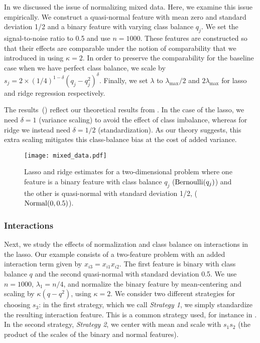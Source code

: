 In  we discussed the issue of normalizing mixed data. Here, we examine
this issue empirically. We construct a quasi-normal feature with mean zero and standard
deviation 1/2 and a binary feature with varying class balance \(q_j\). We set the
signal-to-noise ratio to 0.5 and use \(n = \num{1000}\). These features are constructed so
that their effects are comparable under the notion of comparability that we introduced in
 using \(\kappa = 2\). In order to preserve the comparability for the
baseline case when we have perfect class balance, we scale by \(s_j = 2 \times
(1/4)^{1-\delta}(q_j-q_j^2)^\delta\). Finally, we set \(\lambda\) to
\(\lambda_\text{max}/2\) and \(2\lambda_\text{max}\) for lasso and ridge regression
respectively.

The results~() reflect our theoretical results from
. In the case of the lasso, we need \(\delta =1\) (variance scaling) to
avoid the effect of class imbalance, whereas for ridge we instead need \(\delta =1/2\)
(standardization). As our theory suggests, this extra scaling mitigates this class-balance
bias at the cost of added variance.

\begin{figure}[htpb]
  \centering
  \texttt{[image: mixed\_data.pdf]}
  \caption{%
    Lasso and ridge estimates for a two-dimensional problem where one feature is a binary
    feature with class balance \(q_j\) (\(\operatorname{Bernoulli}(q_j)\)) and the other is quasi-normal
    with standard deviation 1/2, (\(\operatorname{Normal}(0, 0.5)\)).
  }
  \label{fig:lasso-ridge-comparison}
\end{figure}

\subsubsection{Interactions}\label{sec:experiments-interactions}

Next, we study the effects of normalization and class balance on interactions in the lasso.
Our example consists of a two-feature problem with an added interaction term given by
\(x_{i3} = x_{i1}x_{i2}\). The first feature is binary with class balance \(q\) and the
second quasi-normal with standard deviation 0.5. We use \(n=1000\), \(\lambda_1 = n/4\),
and normalize the binary feature by mean-centering and scaling by \(\kappa (q - q^2)\),
using \(\kappa = 2\). We consider two different strategies for choosing \(s_3\): in the
first strategy, which we call \emph{Strategy 1}, we simply standardize the resulting
interaction feature. This is a common strategy used, for instance in
\citet{bien2013,lim2015}. In the second strategy, \emph{Strategy 2}, we center with mean
and scale with \(s_1s_2\) (the product of the scales of the binary and normal features).

